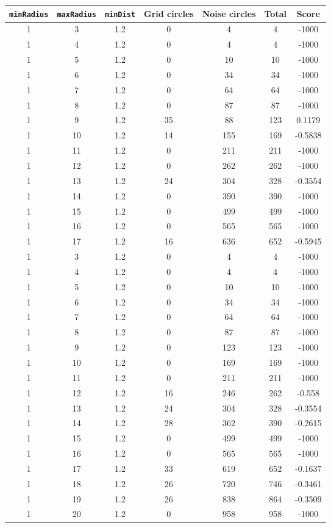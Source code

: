 \documentclass[letterpaper, 12pt]{article}
\begin{document}
\begin{longtable}{|c|c|c|c|c|c|c|}
\hline
\textbf{\texttt{minRadius}} & \textbf{\texttt{maxRadius}} & \textbf{\texttt{minDist}} & \textbf{Grid circles} & \textbf{Noise circles} & \textbf{Total} & \textbf{Score} \\
\hline
1 & 3 & 1.2 & 0 & 4 & 4 & -1000 \\
\hline
1 & 4 & 1.2 & 0 & 4 & 4 & -1000 \\
\hline
1 & 5 & 1.2 & 0 & 10 & 10 & -1000 \\
\hline
1 & 6 & 1.2 & 0 & 34 & 34 & -1000 \\
\hline
1 & 7 & 1.2 & 0 & 64 & 64 & -1000 \\
\hline
1 & 8 & 1.2 & 0 & 87 & 87 & -1000 \\
\hline
1 & 9 & 1.2 & 35 & 88 & 123 & 0.1179 \\
\hline
1 & 10 & 1.2 & 14 & 155 & 169 & -0.5838 \\
\hline
1 & 11 & 1.2 & 0 & 211 & 211 & -1000 \\
\hline
1 & 12 & 1.2 & 0 & 262 & 262 & -1000 \\
\hline
1 & 13 & 1.2 & 24 & 304 & 328 & -0.3554 \\
\hline
1 & 14 & 1.2 & 0 & 390 & 390 & -1000 \\
\hline
1 & 15 & 1.2 & 0 & 499 & 499 & -1000 \\
\hline
1 & 16 & 1.2 & 0 & 565 & 565 & -1000 \\
\hline
1 & 17 & 1.2 & 16 & 636 & 652 & -0.5945 \\
\hline
1 & 3 & 1.2 & 0 & 4 & 4 & -1000 \\
\hline
1 & 4 & 1.2 & 0 & 4 & 4 & -1000 \\
\hline
1 & 5 & 1.2 & 0 & 10 & 10 & -1000 \\
\hline
1 & 6 & 1.2 & 0 & 34 & 34 & -1000 \\
\hline
1 & 7 & 1.2 & 0 & 64 & 64 & -1000 \\
\hline
1 & 8 & 1.2 & 0 & 87 & 87 & -1000 \\
\hline
1 & 9 & 1.2 & 0 & 123 & 123 & -1000 \\
\hline
1 & 10 & 1.2 & 0 & 169 & 169 & -1000 \\
\hline
1 & 11 & 1.2 & 0 & 211 & 211 & -1000 \\
\hline
1 & 12 & 1.2 & 16 & 246 & 262 & -0.558 \\
\hline
1 & 13 & 1.2 & 24 & 304 & 328 & -0.3554 \\
\hline
1 & 14 & 1.2 & 28 & 362 & 390 & -0.2615 \\
\hline
1 & 15 & 1.2 & 0 & 499 & 499 & -1000 \\
\hline
1 & 16 & 1.2 & 0 & 565 & 565 & -1000 \\
\hline
1 & 17 & 1.2 & 33 & 619 & 652 & -0.1637 \\
\hline
1 & 18 & 1.2 & 26 & 720 & 746 & -0.3461 \\
\hline
1 & 19 & 1.2 & 26 & 838 & 864 & -0.3509 \\
\hline
1 & 20 & 1.2 & 0 & 958 & 958 & -1000 \\
\hline
\end{longtable}
\end{document}
